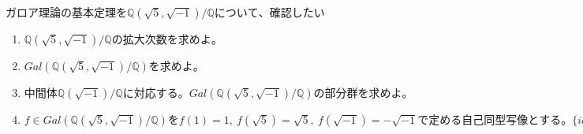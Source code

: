 \documentclass[dvipdfmx]{jsarticle}
\begin{document}
\begin{tcolorbox}[colframe=black!50,colback=white,colbacktitle=black!50,coltitle=white,fonttitle=\bfseries\sffamily,title=練習問題1]
$ガロア理論の基本定理を\mathbb{Q}(\sqrt{5},\sqrt{-1}) / \mathbb{Q}について、確認したい$
\begin{enumerate}
  \item $\mathbb{Q}(\sqrt{5},\sqrt{-1}) / \mathbb{Q}の拡大次数を求めよ。$
  \item $Gal(\mathbb{Q}(\sqrt{5},\sqrt{-1}) / \mathbb{Q})を求めよ。$
  \item $中間体\mathbb{Q}(\sqrt{-1}) / \mathbb{Q}に対応する。Gal(\mathbb{Q}(\sqrt{5},\sqrt{-1}) / \mathbb{Q})の部分群を求めよ。$
  \item $f \in Gal(\mathbb{Q}(\sqrt{5},\sqrt{-1}) / \mathbb{Q})をf(1)=1, \ f(\sqrt{5}) = \sqrt{5}, \ f(\sqrt{-1}) = -\sqrt{-1}で定める自己同型写像とする。\{id,f\}はGal(\mathbb{Q}(\sqrt{5},\sqrt{-1}) / \mathbb{Q})の部分群となるが、これに対応する中間体を求めよ。$
\end{enumerate}
\end{tcolorbox}
\end{document}
